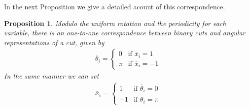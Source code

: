 \documentclass[12pt,a4paper]{article}
\theoremstyle{mythm}
\newtheorem{prop}[thm]{Proposition}
\begin{document}
In the next Proposition we give a detailed acount of this correspondence.
\begin{prop}
Modulo the uniform rotation and the periodicity for each variable, there is an one-to-one correspondence between binary cuts and angular representations
of a cut, given by
\begin{align}
\label{eq:ass1to1} 
\overline{ \theta } _{ i } = \begin{cases}
0 & \text{if } \overline{ x } _{ i } = 1 \\
\pi & \text{if } \overline{ x } _{ i } = -1
\end{cases}
\end{align} 
In the same manner we can set
\begin{align*}
\overline{ x } _{ i } = \begin{cases}
1 & \text{if } \overline{ \theta } _{ i } = 0 \\
-1 & \text{if } \overline{ \theta } _{ i  } = \pi
\end{cases}
\end{align*} 
\end{prop} 
\end{document}

